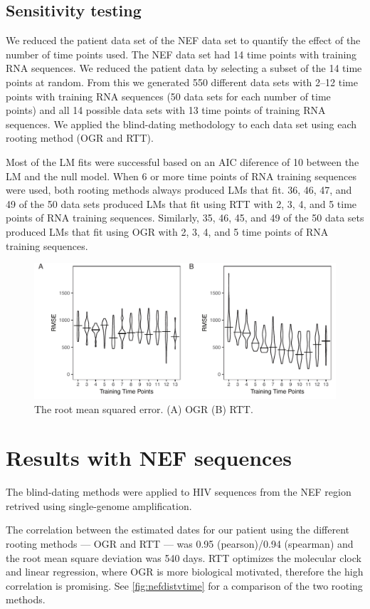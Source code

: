 \documentclass[12pt,onecolumn,twoside]{pnas-new}
\begin{document}
\subsection*{Sensitivity testing}
We reduced the patient data set of the NEF data set to quantify the effect of the number of time points used.
The NEF data set had 14 time points with training RNA sequences.
We reduced the patient data by selecting a subset of the 14 time points at random.
From this we generated 550 different data sets with 2--12 time points with training RNA sequences (50 data sets for each number of time points) and all 14 possible data sets with 13 time points of training RNA sequences.
We applied the blind-dating methodology to each data set using each rooting method (OGR and RTT).

Most of the LM fits were successful based on an AIC diference of 10 between the LM and the null model.
When 6 or more time points of RNA training sequences were used, both rooting methods always produced LMs that fit.
36, 46, 47, and 49 of the 50 data sets produced LMs that fit using RTT with 2, 3, 4, and 5 time points of RNA training sequences.
Similarly, 35, 46, 45, and 49 of the 50 data sets produced LMs that fit using OGR with 2, 3, 4, and 5 time points of RNA training sequences. 

\begin{figure}
\includegraphics{sensitivity}
\caption{The root mean squared error.
(A) OGR (B) RTT.}
\label{fig:sensrmse}
\end{figure}

\section*{Results with NEF sequences}
The blind-dating methods were applied to HIV sequences from the NEF region retrived using single-genome amplification.

The correlation between the estimated dates for our patient using the different rooting methods --- OGR and RTT --- was 0.95 (pearson)/0.94 (spearman) and the root mean square deviation was 540 days.
RTT optimizes the molecular clock and linear regression, where OGR is more biological motivated, therefore the high correlation is promising.
See \cref{fig:nefdistvtime} for a comparison of the two rooting methods.
\end{document}
